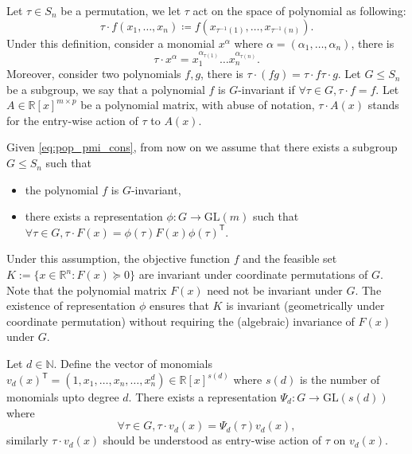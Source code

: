 \documentclass[smallextended]{svjour3}
\newcommand{\R}{\mathbb{R}}
\newcommand{\N}{\mathbb{N}}
\newcommand{\GL}{\mathrm{GL}}
\begin{document}
Let $\tau\in S_n$ be a permutation, we let $\tau$ act on the space of polynomial as following: \begin{equation}
  \tau\cdot f(x_1,\dots,x_n) \coloneqq f(x_{\tau^{-1}(1)},\dots,x_{\tau^{-1}(n)}).
\end{equation}
Under this definition, consider a monomial $x^{\alpha}$ where $\alpha=(\alpha_1,\dots,\alpha_n)$, there is \begin{equation}
  \tau \cdot x^{\alpha} = x_1^{\alpha_{\tau(1)}}\dots x_n^{\alpha_{\tau(n)}}.
\end{equation}
Moreover, consider two polynomials $f,g$, there is $\tau\cdot(fg) = \tau \cdot f \tau \cdot g$. Let $G\leq S_n$ be a subgroup, we say that a polynomial $f$ is $G$-invariant if $\forall \tau\in G, \tau\cdot f = f$. Let $A\in\R[x]^{m\times p}$ be a polynomial matrix, with abuse of notation, $\tau \cdot A(x)$ stands for the entry-wise action of $\tau$ to $A(x)$.

Given \eqref{eq:pop_pmi_cons}, from now on we assume that there exists a subgroup $G\leq S_n$ such that \begin{itemize}
  \item the polynomial $f$ is $G$-invariant,
  \item there exists a representation $\phi: G\rightarrow \GL(m)$ such that $\forall \tau\in G, \tau\cdot F(x) = \phi(\tau) F(x) \phi(\tau)^{\mathsf{T}}$.
\end{itemize}
Under this assumption, the objective function $f$ and the feasible set $K:=\{x\in\R^{n}:F(x)\succeq 0\}$ are invariant under coordinate permutations of $G$. Note that the polynomial matrix $F(x)$ need not be invariant under $G$. The existence of representation $\phi$ ensures that $K$ is invariant (geometrically under coordinate permutation) without requiring the (algebraic) invariance of $F(x)$ under $G$.

Let $d \in \N$. Define the vector of monomials $v_d(x)^{\mathsf{T}} = (1,x_1,\dots,x_n,\dots,x_n^{d})\in\R[x]^{s(d)}$ where $s(d)$ is the number of monomials upto degree $d$. There exists a representation $\Psi_d: G \rightarrow \GL(s(d))$ where \begin{equation}
  \forall \tau\in G, \tau\cdot v_d(x) = \Psi_d(\tau) v_d(x),
\end{equation}
similarly $\tau\cdot v_d(x)$ should be understood as entry-wise action of $\tau$ on $v_d(x)$.
\end{document}
